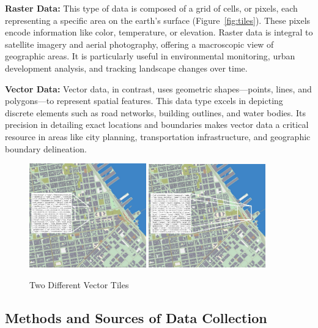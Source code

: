 \documentclass[10pt,oneside,english,a4paper]{article}
\begin{document}
\textbf{Raster Data:} This type of data is composed of a grid of cells, or pixels, each representing a specific area on the earth's surface (Figure~\ref{fig:tiles}). These pixels encode information like color, temperature, or elevation. Raster data is integral to satellite imagery and aerial photography, offering a macroscopic view of geographic areas. It is particularly useful in environmental monitoring, urban development analysis, and tracking landscape changes over time.

\textbf{Vector Data:} Vector data, in contrast, uses geometric shapes—points, lines, and polygons—to represent spatial features. This data type excels in depicting discrete elements such as road networks, building outlines, and water bodies. Its precision in detailing exact locations and boundaries makes vector data a critical resource in areas like city planning, transportation infrastructure, and geographic boundary delineation.

\begin{figure}[h]
	\centering
	\includegraphics[width=0.45\textwidth]{diagram6a.jpg}
	\hfill
	\includegraphics[width=0.45\textwidth]{diagram6b.jpg}
	\caption{Two Different Vector Tiles}
	\label{fig:vector}
\end{figure}

\subsection {Methods and Sources of Data Collection} \label{data:sources}
\end{document}
